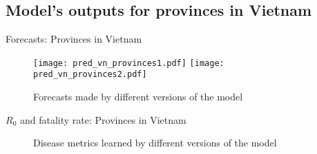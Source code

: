 \subsection{Model's outputs for provinces in Vietnam}

\begin{frame}{Forecasts: Provinces in Vietnam}
    \begin{figure}[!htb]
        \centering
        \texttt{[image: pred\_vn\_provinces1.pdf]}
        \texttt{[image: pred\_vn\_provinces2.pdf]}
        \caption{Forecasts made by different versions of the model}
    \end{figure}
\end{frame}

\begin{frame}{$R_0$ and fatality rate: Provinces in Vietnam}
    \begin{figure}[!htb]
        \centering
        \caption{Disease metrics learned by different versions of the model}
    \end{figure}
\end{frame}
